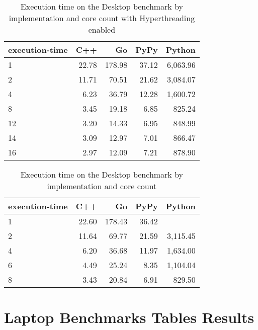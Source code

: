 \begin{table}[h]
 \centering
    \begin{tabular}{lrrrr}
    \hline
    execution-time & C++ & Go & PyPy & Python \\
    \hline
    1 & 22.78 & 178.98 & 37.12 & 6,063.96 \\
    2 & 11.71 & 70.51 & 21.62 & 3,084.07 \\
    4 & 6.23 & 36.79 & 12.28 & 1,600.72 \\
    8 & 3.45 & 19.18 & 6.85 & 825.24 \\
    12 & 3.20 & 14.33 & 6.95 & 848.99 \\
    14 & 3.09 & 12.97 & 7.01 & 866.47 \\
    16 & 2.97 & 12.09 & 7.21 & 878.90 \\
    \hline
    \end{tabular}
\caption[Desktop - Execution Time with Hyperthreading]{Execution time on the Desktop benchmark by implementation and core count with Hyperthreading enabled}
\label{tab:desktop-execution-time-hyperthreading}
\end{table}

\begin{table}[h]
    \centering
    \begin{tabular}{lrrrr}
        \hline
        execution-time & C++                 & Go          & PyPy       & Python              \\
        \hline
        1              & 22.60               & 178.43      & 36.42      &                    \\
        2              & 11.64               & 69.77       & 21.59      & 3,115.45           \\
        4              & 6.20                & 36.68       & 11.97      & 1,634.00           \\
        6              & 4.49                & 25.24       & 8.35       & 1,104.04           \\
        8	           & 3.43                & 20.84       & 6.91       & 829.50             \\
        \hline
    \end{tabular}
\caption[Desktop - Execution Time]{Execution time on the Desktop benchmark by implementation and core count}
\label{tab:desktop-execution-time}
\end{table}

\chapter{Laptop Benchmarks Tables Results}
\label{chap:appendix-laptop-benchmarks}

